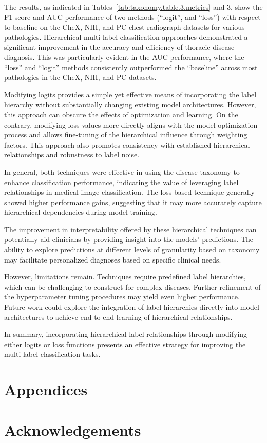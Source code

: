 The results, as indicated in Tables~\ref{tab:taxonomy.table.3.metrics} and 3, show the F1 score and AUC performance of two methods (``logit'', and ``loss'') with respect to baseline on the CheX, NIH, and PC chest radiograph datasets for various pathologies. Hierarchical multi-label classification approaches demonstrated a significant improvement in the accuracy and efficiency of thoracic disease diagnosis. This was particularly evident in the AUC performance, where the ``loss'' and ``logit'' methods consistently outperformed the ``baseline'' across most pathologies in the CheX, NIH, and PC datasets.

Modifying logits provides a simple yet effective means of incorporating the label hierarchy without substantially changing existing model architectures. However, this approach can obscure the effects of optimization and learning. On the contrary, modifying loss values more directly aligns with the model optimization process and allows fine-tuning of the hierarchical influence through weighting factors. This approach also promotes consistency with established hierarchical relationships and robustness to label noise.

In general, both techniques were effective in using the disease taxonomy to enhance classification performance, indicating the value of leveraging label relationships in medical image classification. The loss-based technique generally showed higher performance gains, suggesting that it may more accurately capture hierarchical dependencies during model training.

The improvement in interpretability offered by these hierarchical techniques can potentially aid clinicians by providing insight into the models' predictions. The ability to explore predictions at different levels of granularity based on taxonomy may facilitate personalized diagnoses based on specific clinical needs.

However, limitations remain. Techniques require predefined label hierarchies, which can be challenging to construct for complex diseases. Further refinement of the hyperparameter tuning procedures may yield even higher performance. Future work could explore the integration of label hierarchies directly into model architectures to achieve end-to-end learning of hierarchical relationships.

In summary, incorporating hierarchical label relationships through modifying either logits or loss functions presents an effective strategy for improving the multi-label classification tasks.

\section*{Appendices}
\section*{Acknowledgements}


